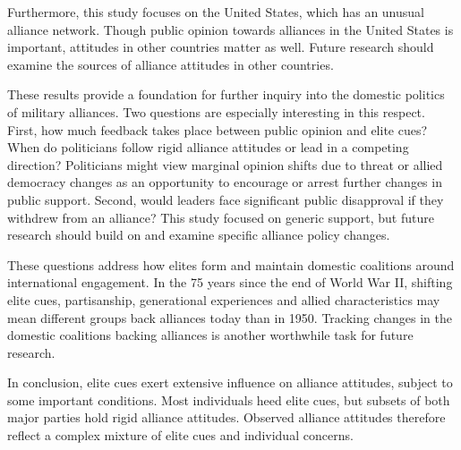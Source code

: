 \documentclass[12pt]{article}
\begin{document}
Furthermore, this study focuses on the United States, which has an unusual alliance network. 
Though public opinion towards alliances in the United States is important, attitudes in other countries matter as well. 
Future research should examine the sources of alliance attitudes in other countries. 


These results provide a foundation for further inquiry into the domestic politics of military alliances. 
Two questions are especially interesting in this respect.
First, how much feedback takes place between public opinion and elite cues? 
When do politicians follow rigid alliance attitudes or lead in a competing direction? 
Politicians might view marginal opinion shifts due to threat or allied democracy changes as an opportunity to encourage or arrest further changes in public support.
Second, would leaders face significant public disapproval if they withdrew from an alliance? 
This study focused on generic support, but future research should build on \citet{TomzWeeks2021} and examine specific alliance policy changes. 


These questions address how elites form and maintain domestic coalitions around international engagement. 
In the 75 years since the end of World War II, shifting elite cues, partisanship, generational experiences and allied characteristics may mean different groups back alliances today than in 1950. 
Tracking changes in the domestic coalitions backing alliances is another worthwhile task for future research.


In conclusion, elite cues exert extensive influence on alliance attitudes, subject to some important conditions.
Most individuals heed elite cues, but subsets of both major parties hold rigid alliance attitudes. 
Observed alliance attitudes therefore reflect a complex mixture of elite cues and individual concerns. 



\newpage

 
 
\end{document}
